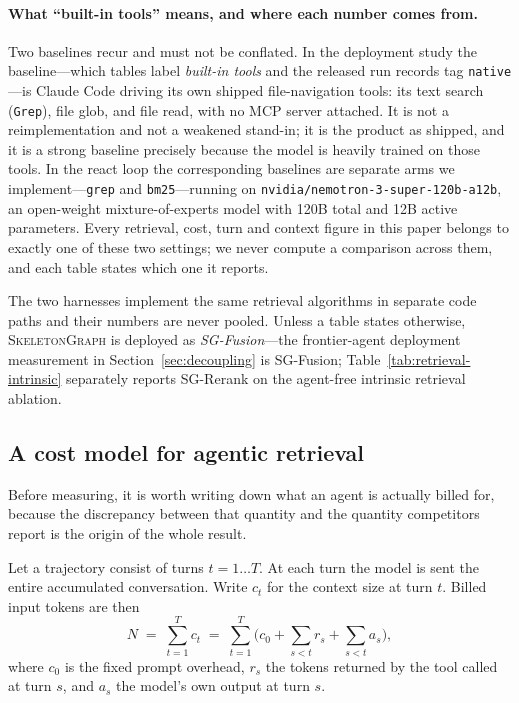 \documentclass[11pt,letterpaper]{article}
\newcommand{\sg}{\textsc{SkeletonGraph}}
\begin{document}
\paragraph{What ``built-in tools'' means, and where each number comes from.}
Two baselines recur and must not be conflated. In the deployment study the
baseline---which tables label \emph{built-in tools} and the released run records
tag \texttt{native}---is Claude Code driving its own shipped file-navigation
tools: its text search (\texttt{Grep}), file glob, and file read, with no MCP
server attached. It is not a reimplementation and not a weakened stand-in; it is
the product as shipped, and it is a strong baseline precisely because the model is
heavily trained on those tools. In the react loop the corresponding baselines are
separate arms we implement---\texttt{grep} and \texttt{bm25}---running on
\texttt{nvidia/nemotron-3-super-120b-a12b}, an open-weight mixture-of-experts model
with 120B total and 12B active parameters. Every retrieval, cost, turn and context figure in
this paper belongs to exactly one of these two settings; we never compute a
comparison across them, and each table states which one it reports.

The two harnesses implement the same retrieval algorithms in separate code paths
and their numbers are never pooled. Unless a table states otherwise, \sg{} is
deployed as \emph{SG-Fusion}---the frontier-agent deployment measurement in
Section~\ref{sec:decoupling} is SG-Fusion; Table~\ref{tab:retrieval-intrinsic}
separately reports SG-Rerank on the agent-free intrinsic retrieval ablation.

\subsection{A cost model for agentic retrieval}
\label{sec:model}
Before measuring, it is worth writing down what an agent is actually billed for,
because the discrepancy between that quantity and the quantity competitors report
is the origin of the whole result.

Let a trajectory consist of turns $t = 1 \dots T$. At each turn the model is sent
the entire accumulated conversation. Write $c_t$ for the context size at turn $t$.
Billed input tokens are then
\begin{equation}
N \;=\; \sum_{t=1}^{T} c_t \;=\; \sum_{t=1}^{T}\Big( c_0 + \textstyle\sum_{s<t} r_s + \sum_{s<t} a_s \Big),
\label{eq:cost}
\end{equation}
where $c_0$ is the fixed prompt overhead, $r_s$ the tokens returned by the tool
called at turn $s$, and $a_s$ the model's own output at turn $s$.
\end{document}
